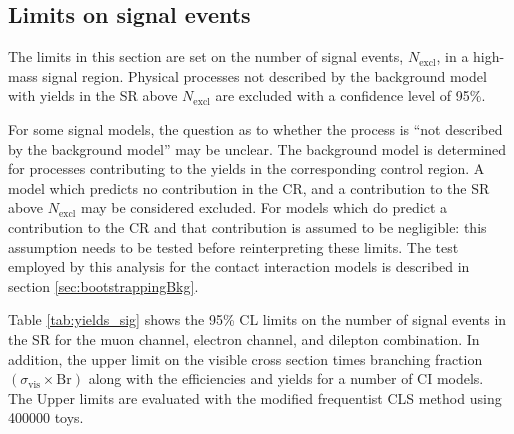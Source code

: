 \subsection{Limits on signal events}
\label{sec:limNSig}

The limits in this section are set on the number of signal events, $N_\text{excl}$, in a high-mass signal region. Physical processes not described by the background model with yields in the SR above $N_\text{excl}$ are excluded with a confidence level of 95\%.

For some signal models, the question as to whether the process is ``not described by the background model'' may be unclear. The background model is determined for processes contributing to the yields in the corresponding control region. A model which predicts no contribution in the CR, and a contribution to the SR above $N_\text{excl}$ may be considered excluded. For models which do predict a contribution to the CR and that contribution is assumed to be negligible: this assumption needs to be tested before reinterpreting these limits. The test employed by this analysis for the contact interaction models is described in section \ref{sec:bootstrappingBkg}.

Table \ref{tab:yields_sig} shows the 95\% CL limits on the number of signal events in the SR for the muon channel, electron channel, and dilepton combination. In addition, the upper limit on the visible cross section times branching fraction $(\sigma_\textrm{vis}\times\textrm{Br})$ along with the efficiencies and yields for a number of CI models.  The Upper limits are evaluated with the modified frequentist CLS method using 400000 toys.


